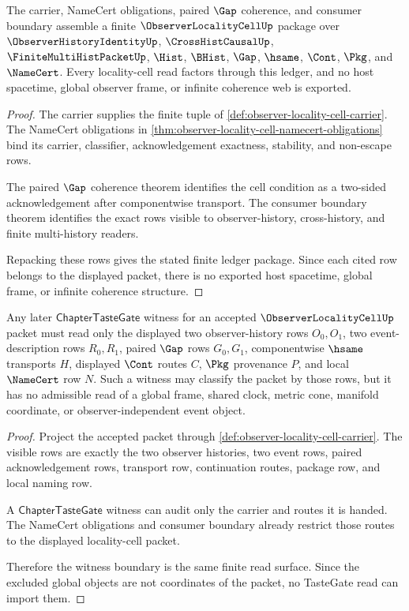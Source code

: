 \begin{theorem}
\label{thm:observer-locality-cell-finite-ledger-package}
The carrier, NameCert obligations, paired $\Gap$ coherence, and consumer boundary assemble a finite $\ObserverLocalityCellUp$ package over $\ObserverHistoryIdentityUp$, $\CrossHistCausalUp$, $\FiniteMultiHistPacketUp$, $\Hist$, $\BHist$, $\Gap$, $\hsame$, $\Cont$, $\Pkg$, and $\NameCert$. Every locality-cell read factors through this ledger, and no host spacetime, global observer frame, or infinite coherence web is exported.
\end{theorem}
\begin{proof}
The carrier supplies the finite tuple of \autoref{def:observer-locality-cell-carrier}. The NameCert obligations in \autoref{thm:observer-locality-cell-namecert-obligations} bind its carrier, classifier, acknowledgement exactness, stability, and non-escape rows.

The paired $\Gap$ coherence theorem identifies the cell condition as a two-sided acknowledgement after componentwise transport. The consumer boundary theorem identifies the exact rows visible to observer-history, cross-history, and finite multi-history readers.

Repacking these rows gives the stated finite ledger package. Since each cited row belongs to the displayed packet, there is no exported host spacetime, global frame, or infinite coherence structure.
\end{proof}

\begin{theorem}
\label{thm:observer-locality-cell-tastegate-witness-boundary}
Any later $\mathsf{ChapterTasteGate}$ witness for an accepted $\ObserverLocalityCellUp$ packet must read only the displayed two observer-history rows $O_0,O_1$, two event-description rows $R_0,R_1$, paired $\Gap$ rows $G_0,G_1$, componentwise $\hsame$ transports $H$, displayed $\Cont$ routes $C$, $\Pkg$ provenance $P$, and local $\NameCert$ row $N$. Such a witness may classify the packet by those rows, but it has no admissible read of a global frame, shared clock, metric cone, manifold coordinate, or observer-independent event object.
\end{theorem}
\begin{proof}
Project the accepted packet through \autoref{def:observer-locality-cell-carrier}. The visible rows are exactly the two observer histories, two event rows, paired acknowledgement rows, transport row, continuation routes, package row, and local naming row.

A $\mathsf{ChapterTasteGate}$ witness can audit only the carrier and routes it is handed. The NameCert obligations and consumer boundary already restrict those routes to the displayed locality-cell packet.

Therefore the witness boundary is the same finite read surface. Since the excluded global objects are not coordinates of the packet, no TasteGate read can import them.
\end{proof}

